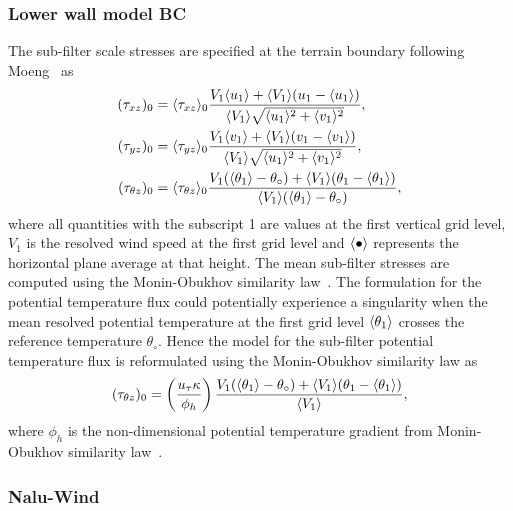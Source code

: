 \subsubsection{\label{sec:wallmodelBC}Lower wall model BC}
The sub-filter scale stresses are specified at the terrain boundary following
Moeng~\cite{Moeng1984} as
\begin{align}
 (\tau_{xz})_0 &= \langle \tau_{xz} \rangle_0 \frac{V_1 \langle {u}_1 \rangle + \langle V_1 \rangle ({u}_1 - \langle {u}_1 \rangle ) }{ \langle V_1 \rangle \sqrt{\langle {u}_1 \rangle^2 + \langle {v}_1 \rangle^2 } } , \\
 (\tau_{yz})_0 &= \langle \tau_{yz} \rangle_0 \frac{V_1 \langle {v}_1 \rangle + \langle V_1 \rangle ({v}_1 - \langle {v}_1 \rangle ) }{ \langle V_1 \rangle \sqrt{\langle {u}_1 \rangle^2 + \langle {v}_1 \rangle^2 } } , \\
  (\tau_{\theta z})_0 &= \langle \tau_{\theta z} \rangle_0 \frac{V_1 ( \langle {\theta}_1 \rangle - \theta_{\circ} ) + \langle V_1 \rangle ({\theta}_1 - \langle {\theta}_1 \rangle ) }{ \langle V_1 \rangle ( \langle {\theta}_1 \rangle - \theta_{\circ} ) },
\end{align}
where all quantities with the subscript 1 are values at the first vertical grid
level, $V_1$ is the resolved wind speed at the first grid level and
$\langle \bullet \rangle$ represents the horizontal plane average at that height. The mean
sub-filter stresses are computed using the Monin-Obukhov similarity
law~\cite{Etling1996}. The formulation for the potential temperature flux could
potentially experience a singularity when the mean resolved potential
temperature at the first grid level $\langle {\theta}_1 \rangle$ crosses the
reference temperature $\theta_{\circ}$. Hence the model for the sub-filter
potential temperature flux is reformulated using the Monin-Obukhov similarity
law as
\begin{equation}
(\tau_{\theta z})_0 = \left ( \frac{u_{\tau} \kappa}{ \phi_h} \right ) \frac{V_1 ( \langle {\theta}_1 \rangle - \theta_{\circ} ) + \langle V_1 \rangle ({\theta}_1 - \langle {\theta}_1 \rangle ) }{ \langle V_1 \rangle },
\end{equation}
where $\phi_h$ is the non-dimensional potential temperature gradient from
Monin-Obukhov similarity law~\cite{Etling1996}.


\subsubsection{Nalu-Wind}


